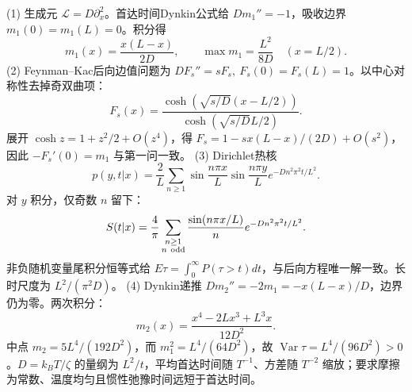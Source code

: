 (1) 生成元 \(\mathcal L=D\partial_x^2\)。首达时间Dynkin公式给 \(Dm_1''=-1\)，吸收边界 \(m_1(0)=m_1(L)=0\)。积分得
\[
m_1(x)=\frac{x(L-x)}{2D},\qquad \max m_1=\frac{L^2}{8D}\quad(x=L/2).
\]
(2) Feynman--Kac后向边值问题为 \(DF_s''=sF_s,\ F_s(0)=F_s(L)=1\)。以中心对称性去掉奇双曲项：
\[
F_s(x)=\frac{\cosh(\sqrt{s/D}(x-L/2))}{\cosh(\sqrt{s/D}L/2)}.
\]
展开 \(\cosh z=1+z^2/2+O(z^4)\)，得 \(F_s=1-sx(L-x)/(2D)+O(s^2)\)，因此 \(-F_s'(0)=m_1\) 与第一问一致。
(3) Dirichlet热核
\[
p(y,t|x)=\frac2L\sum_{n\ge1}\sin\frac{n\pi x}{L}\sin\frac{n\pi y}{L}e^{-Dn^2\pi^2t/L^2}.
\]
对 \(y\) 积分，仅奇数 \(n\) 留下：
\[
S(t|x)=\frac4\pi\sum_{\substack{n\ge1\\n\ {\rm odd}}}\frac{\sin(n\pi x/L)}n e^{-Dn^2\pi^2t/L^2}.
\]
非负随机变量尾积分恒等式给 \(E\tau=\int_0^\infty P(\tau>t)dt\)，与后向方程唯一解一致。长时尺度为 \(L^2/(\pi^2D)\)。
(4) Dynkin递推 \(Dm_2''=-2m_1= -x(L-x)/D\)，边界仍为零。两次积分：
\[
m_2(x)=\frac{x^4-2Lx^3+L^3x}{12D^2}.
\]
中点 \(m_2=5L^4/(192D^2)\)，而 \(m_1^2=L^4/(64D^2)\)，故 \(\operatorname{Var}\tau=L^4/(96D^2)>0\)。\(D=k_BT/\zeta\) 的量纲为 \(L^2/t\)，平均首达时间随 \(T^{-1}\)、方差随 \(T^{-2}\) 缩放；要求摩擦为常数、温度均匀且惯性弛豫时间远短于首达时间。

